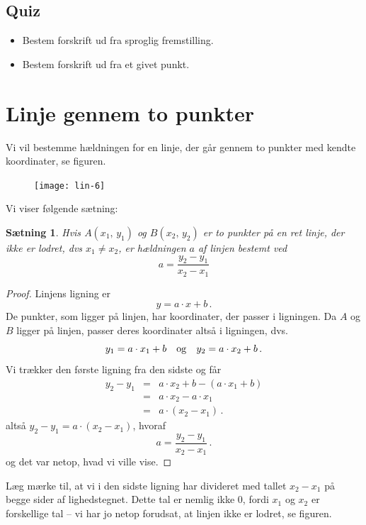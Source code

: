 \documentclass[12pt,oneside,a4paper]{article}
\newcommand{\bas}{\begin{eqnarray*}}
\newcommand{\eas}{\end{eqnarray*}}
\newtheorem{thm}{Sætning}[section]
\begin{document}
\subsection{Quiz}
\begin{itemize}
    \item Bestem forskrift ud fra sproglig fremstilling.
    \item Bestem forskrift ud fra et givet punkt.
\end{itemize}


\section{Linje gennem to punkter}
Vi vil bestemme hældningen for en linje, der går gennem
to punkter med kendte koordinater, se figuren.
\begin{figure}[H]
    \centering
    \texttt{[image: lin-6]}
    \caption{}
\end{figure}

Vi viser følgende sætning:
\begin{tcolorbox}
\begin{thm}
    Hvis $A(x_1,\,y_1)$ og $B(x_2,\,y_2)$ er to punkter på en ret linje, der ikke
    er lodret, dvs $x_1\neq x_2$, er hældningen $a$ af linjen bestemt ved
    $$
    a = \frac{y_2-y_1}{x_2-x_1}
    $$
\end{thm}
\end{tcolorbox}

\begin{proof}
    Linjens ligning er
    $$
    y = a\cdot x + b \,.
    $$
    De punkter, som ligger på linjen, har koordinater, der passer i
    ligningen.  Da $A$ og $B$ ligger på linjen, passer deres koordinater altså
    i ligningen, dvs.
    $$
    y_1 = a\cdot x_1 + b \quad {\rm og} \quad y_2 = a\cdot x_2 + b \,.
    $$
    Vi trækker den første ligning fra den sidste og får
    \bas
    y_2 - y_1 &=& a\cdot x_2 + b - (a\cdot x_1 + b) \\
              &=& a\cdot x_2 - a\cdot x_1 \\
              &=& a\cdot \left(x_2-x_1\right)  \,.
    \eas
    altså $y_2-y_1 = a \cdot \left(x_2-x_1\right)$, hvoraf
    $$
    a = \frac{y_2-y_1}{x_2-x_1} \,.
    $$
    og det var netop, hvad vi ville vise.
\end{proof}

Læg mærke til, at vi i den sidste ligning har divideret med tallet $x_2-x_1$ på
begge sider af lighedstegnet. Dette tal er nemlig ikke $0$, fordi $x_1$ og
$x_2$ er forskellige tal -- vi har jo netop forudsat, at linjen ikke er lodret, se
figuren.
\end{document}
